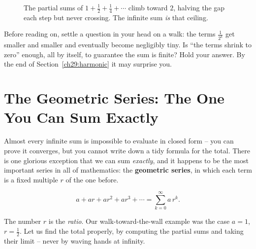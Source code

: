 \begin{figure}[H]
\centering
{}
\caption{The partial sums of $1 + \tfrac12 + \tfrac14 + \cdots$ climb toward $2$, halving the gap each step but never crossing. The infinite sum \emph{is} that ceiling.}
\label{ch29:fig-partialsums}
\end{figure}

\begin{walkbox}
Before reading on, settle a question in your head on a walk: the terms $\tfrac{1}{2^k}$ get smaller and smaller and eventually become negligibly tiny. Is ``the terms shrink to zero'' enough, all by itself, to guarantee the sum is finite? Hold your answer. By the end of Section~\ref{ch29:harmonic} it may surprise you.
\end{walkbox}

\section{The Geometric Series: The One You Can Sum Exactly}
\label{ch29:geometric}

Almost every infinite sum is impossible to evaluate in closed form -- you can prove it converges, but you cannot write down a tidy formula for the total. There is one glorious exception that we can sum \emph{exactly}, and it happens to be the most important series in all of mathematics: the \textbf{geometric series}, in which each term is a fixed multiple $r$ of the one before.

\[
a + ar + ar^2 + ar^3 + \cdots = \sum_{k=0}^{\infty} a\, r^k .
\]

The number $r$ is the \emph{ratio}. Our walk-toward-the-wall example was the case $a=1$, $r=\tfrac12$. Let us find the total properly, by computing the partial sums and taking their limit -- never by waving hands at infinity.

